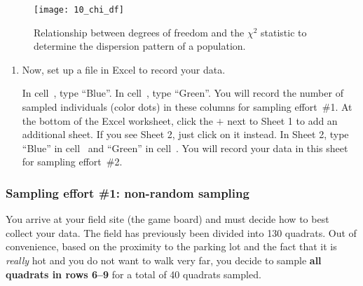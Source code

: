 \documentclass[12pt, hidelinks]{exam}
\newcommand\chisq{$\chi^2$}
\newcommand*\xcell[1]{cell~\liningnum{#1}}
\begin{document}
\begin{figure}[h!]
	\begin{center}
	\captionsetup{width=0.5\textwidth}
	\texttt{[image: 10\_chi\_df]}
	\caption{Relationship between degrees of freedom and the \chisq{}
statistic to determine the dispersion pattern of a
population.}\label{fig:chi_df}
	\end{center}
\end{figure}

\begin{enumerate}[resume]

\item Now, set up a file in Excel to record your data.

In \xcell{A1}, type “Blue”. In \xcell{D1}, type “Green”. You will record the number of sampled individuals (color dots) in these columns for sampling effort~\#1. At the bottom of the Excel worksheet, click the $+$ next to Sheet 1 to add an additional sheet. If you see Sheet 2, just click on it instead. In Sheet 2,
type “Blue” in \xcell{A1} and “Green” in \xcell{D1}. You will record your data
in this sheet for sampling effort~\#2.

\end{enumerate}

\subsubsection*{Sampling effort \#1: non-random sampling}

You arrive at your field site (the game board) and must decide
how to best collect your data. The field has previously been divided
into 130 quadrats. Out of convenience, based on the proximity to the
parking lot and the fact that it is \emph{really} hot and you do not want to
walk very far, you decide to sample \textbf{all quadrats in rows 6–9}
for a total of 40 quadrats sampled. 
\end{document}
